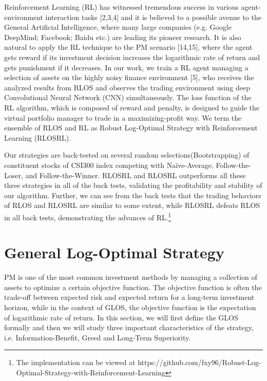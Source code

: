 \documentclass{gapd}
\begin{document}
Reinforcement Learning (RL) has witnessed tremendous success in various agent-environment interaction tasks [2,3,4] and it is believed to a possible avenue to the General Artificial Intelligence, where many large companies (e.g. Google DeepMind; Facebook; Baidu etc.) are leading its pioneer research. It is also natural to apply the RL technique to the PM scenario [14,15], where the agent gets reward if its investment decision increases the logarithmic rate of return and gets punishment if it decreases. In our work, we train a RL agent managing a selection of assets on the highly noisy finance environment [5], who receives the analyzed results from RLOS and observes the trading environment using deep Convolutional Neural Network (CNN) simultaneously. The loss function of the RL algorithm, which is composed of reward and penalty, is designed to guide the virtual portfolio manager to trade in a maximizing-profit way. We term the ensemble of RLOS and RL as Robust Log-Optimal Strategy with Reinforcement Learning (RLOSRL).

Our strategies are back-tested on several random selections(Bootstrapping) of constituent stocks of CSI300 index competing with Naïve-Average, Follow-the-Loser, and Follow-the-Winner. RLOSRL and RLOSRL outperforms all these three strategies in all of the back tests, validating the profitability and stability of our algorithm. Further, we can see from the back tests that the trading behaviors of RLOS and RLOSRL are similar to some extent, while RLOSRL defeats RLOS in all back tests, demonstrating the advances of RL.\footnote{The implementation can be viewed at https://github.com/fxy96/Robust-Log-Optimal-Strategy-with-Reinforcement-Learning}



\section{General Log-Optimal Strategy}
\label{sec:Uniqueness}

PM is one of the most common investment methods by managing a collection of assets to optimize a certain objective function. The objective function is often the trade-off between expected risk and expected return for a long-term investment horizon, while in the context of GLOS, the objective function is the expectation of logarithmic rate of return. In this section, we will first define the GLOS formally and then we will study three important characteristics of the strategy, i.e. Information-Benefit, Greed and Long-Term Superiority.
\end{document}
